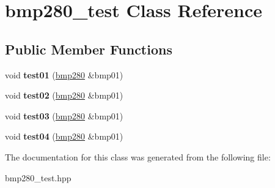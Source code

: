\hypertarget{classbmp280__test}{}\section{bmp280\+\_\+test Class Reference}
\label{classbmp280__test}
\subsection*{Public Member Functions}
\begin{DoxyCompactItemize}
\item 
\mbox{\label{classbmp280__test_a780879283e7600f2b2a330cc0665c5cb}} 
void {\bfseries test01} (\mbox{\hyperlink{classbmp280}{bmp280}} \&bmp01)
\item 
\mbox{\label{classbmp280__test_ab279eb354cb1c98156f332d3e12f74f6}} 
void {\bfseries test02} (\mbox{\hyperlink{classbmp280}{bmp280}} \&bmp01)
\item 
\mbox{\label{classbmp280__test_a0eb4e55e4470fd551e041e8f73d77516}} 
void {\bfseries test03} (\mbox{\hyperlink{classbmp280}{bmp280}} \&bmp01)
\item 
\mbox{\label{classbmp280__test_a0de00fd2a0a9da4484aedf38adb5613f}} 
void {\bfseries test04} (\mbox{\hyperlink{classbmp280}{bmp280}} \&bmp01)
\end{DoxyCompactItemize}


The documentation for this class was generated from the following file\+:\begin{DoxyCompactItemize}
\item 
bmp280\+\_\+test.\+hpp\end{DoxyCompactItemize}
